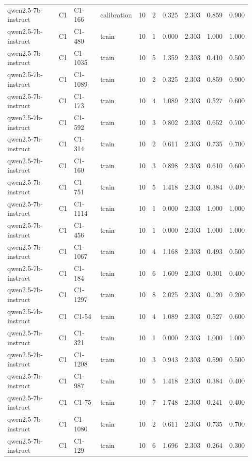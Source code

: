 \begin{table}
\begin{tabular}{llllrrrrrr}
qwen2.5-7b-instruct & C1 & C1-166 & calibration & 10 & 2 & 0.325 & 2.303 & 0.859 & 0.900 \\
qwen2.5-7b-instruct & C1 & C1-480 & train & 10 & 1 & 0.000 & 2.303 & 1.000 & 1.000 \\
qwen2.5-7b-instruct & C1 & C1-1035 & train & 10 & 5 & 1.359 & 2.303 & 0.410 & 0.500 \\
qwen2.5-7b-instruct & C1 & C1-1089 & train & 10 & 2 & 0.325 & 2.303 & 0.859 & 0.900 \\
qwen2.5-7b-instruct & C1 & C1-173 & train & 10 & 4 & 1.089 & 2.303 & 0.527 & 0.600 \\
qwen2.5-7b-instruct & C1 & C1-592 & train & 10 & 3 & 0.802 & 2.303 & 0.652 & 0.700 \\
qwen2.5-7b-instruct & C1 & C1-314 & train & 10 & 2 & 0.611 & 2.303 & 0.735 & 0.700 \\
qwen2.5-7b-instruct & C1 & C1-160 & train & 10 & 3 & 0.898 & 2.303 & 0.610 & 0.600 \\
qwen2.5-7b-instruct & C1 & C1-751 & train & 10 & 5 & 1.418 & 2.303 & 0.384 & 0.400 \\
qwen2.5-7b-instruct & C1 & C1-1114 & train & 10 & 1 & 0.000 & 2.303 & 1.000 & 1.000 \\
qwen2.5-7b-instruct & C1 & C1-456 & train & 10 & 1 & 0.000 & 2.303 & 1.000 & 1.000 \\
qwen2.5-7b-instruct & C1 & C1-1067 & train & 10 & 4 & 1.168 & 2.303 & 0.493 & 0.500 \\
qwen2.5-7b-instruct & C1 & C1-184 & train & 10 & 6 & 1.609 & 2.303 & 0.301 & 0.400 \\
qwen2.5-7b-instruct & C1 & C1-1297 & train & 10 & 8 & 2.025 & 2.303 & 0.120 & 0.200 \\
qwen2.5-7b-instruct & C1 & C1-54 & train & 10 & 4 & 1.089 & 2.303 & 0.527 & 0.600 \\
qwen2.5-7b-instruct & C1 & C1-321 & train & 10 & 1 & 0.000 & 2.303 & 1.000 & 1.000 \\
qwen2.5-7b-instruct & C1 & C1-1208 & train & 10 & 3 & 0.943 & 2.303 & 0.590 & 0.500 \\
qwen2.5-7b-instruct & C1 & C1-987 & train & 10 & 5 & 1.418 & 2.303 & 0.384 & 0.400 \\
qwen2.5-7b-instruct & C1 & C1-75 & train & 10 & 7 & 1.748 & 2.303 & 0.241 & 0.400 \\
qwen2.5-7b-instruct & C1 & C1-1080 & train & 10 & 2 & 0.611 & 2.303 & 0.735 & 0.700 \\
qwen2.5-7b-instruct & C1 & C1-129 & train & 10 & 6 & 1.696 & 2.303 & 0.264 & 0.300 \\

\end{tabular}
\end{table}
